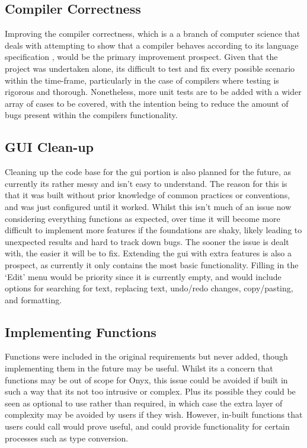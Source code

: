 \documentclass[
]{report}
\begin{document}
\subsection{Compiler Correctness}
Improving the compiler correctness, which is a a branch of computer
science that deals with attempting to show that a compiler behaves
according to its language specification \cite{correctness-wiki}, would be the primary
improvement prospect. Given that the project was undertaken alone, its
difficult to test and fix every possible scenario within the time-frame,
particularly in the case of compilers where testing is rigorous and
thorough. Nonetheless, more unit tests are to be added with a wider
array of cases to be covered, with the intention being to reduce the
amount of bugs present within the compilers functionality.

\subsection{GUI Clean-up}
Cleaning up the code base for the \acrshort{gui} portion is also planned for the
future, as currently its rather messy and isn't easy to understand. The
reason for this is that it was built without prior knowledge of common
practices or conventions, and was just configured until it worked.
Whilst this isn't much of an issue now considering everything functions
as expected, over time it will become more difficult to implement more
features if the foundations are shaky, likely leading to unexpected
results and hard to track down bugs. The sooner the issue is dealt with,
the easier it will be to fix. Extending the \acrshort{gui} with extra features is
also a prospect, as currently it only contains the most basic
functionality. Filling in the `Edit' menu would be priority since it is
currently empty, and would include options for searching for text,
replacing text, undo/redo changes, copy/pasting, and formatting.

\subsection{Implementing Functions}
Functions were included in the original requirements but never added,
though implementing them in the future may be useful. Whilst its a
concern that functions may be out of scope for Onyx, this issue could be
avoided if built in such a way that its not too intrusive or complex.
Plus its possible they could be seen as optional to use rather than
required, in which case the extra layer of complexity may be avoided by
users if they wish. However, in-built functions that users could call
would prove useful, and could provide functionality for certain
processes such as type conversion.
\end{document}
